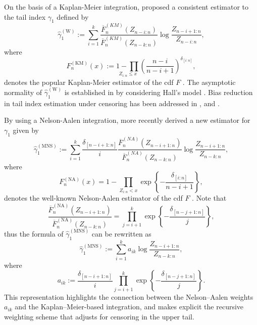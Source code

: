\documentclass[reqno,openbib,runningheads,a4paper,12pt]{amsart}%
\begin{document}
\noindent On the basis of a Kaplan-Meier integration, \cite{WW2014} proposed a
consistent estimator to the tail index $\gamma_{1}$ defined by
\[
\widehat{\gamma}_{1}^{\left(  \mathrm{W}\right)  }:=%
{\displaystyle\sum\limits_{i=1}^{k}}
\frac{\overline{F}_{n}^{\left(  KM\right)  }\left(  Z_{n-i:n}\right)
}{\overline{F}_{n}^{\left(  KM\right)  }\left(  Z_{n-k:n}\right)  }\log
\frac{Z_{n-i+1:n}}{Z_{n-i:n}},
\]
where
\[
F_{n}^{\left(  \mathrm{KM}\right)  }\left(  x\right)  :=\underset{Z_{i:n}\leq
x}{1-%
{\displaystyle\prod}
}\left(  \dfrac{n-i}{n-i+1}\right)  ^{\delta_{\left[  i:n\right]  }},
\]
denotes the popular Kaplan-Meier estimator of the cdf $F$ \citep[] []{KM58}.
The asymptotic normality of $\widehat{\gamma}_{1}^{\left(  \mathrm{W}\right)
}$ is established in \cite{BWW2019} by considering Hall's model
\citep[] []{Hall82}. Bias reduction in tail index estimation under censoring
has been addressed in \cite{BBWG2016}, \cite{BMV2018} and \cite{BWW2019}%
.\smallskip

\noindent By using a Nelson-Aalen integration, more recently \cite{MNS2025}
derived a new estimator for $\gamma_{1}$ given by%
\[
\widehat{\gamma}_{1}^{\left(  \mathrm{MNS}\right)  }:=%
{\displaystyle\sum\limits_{i=1}^{k}}
\frac{\delta_{\left[  n-i+1:n\right]  }}{i}\frac{\overline{F}_{n}^{\left(
NA\right)  }\left(  Z_{n-i+1:n}\right)  }{\overline{F}_{n}^{\left(  NA\right)
}\left(  Z_{n-k:n}\right)  }\log\frac{Z_{n-i+1:n}}{Z_{n-k:n}},
\]
where
\begin{equation}
F_{n}^{\left(  \mathrm{NA}\right)  }\left(  x\right)  =1-\prod_{Z_{i:n}<x}%
\exp\left\{  -\frac{\delta_{\left[  i:n\right]  }}{n-i+1}\right\}
,\label{Nelson}%
\end{equation}
denotes the well-known Nelson-Aalen estimator of the cdf $F$
\citep[] []{Nelson1972}. Note that
\begin{equation}
\frac{\overline{F}_{n}^{\left(  \mathrm{NA}\right)  }\left(  Z_{n-i+1:n}%
\right)  }{\overline{F}_{n}^{\left(  \mathrm{NA}\right)  }\left(
Z_{n-k:n}\right)  }=\prod_{j=i+1}^{k}\exp\left\{  -\frac{\delta_{\left[
n-j+1:n\right]  }}{j}\right\}  ,\label{ratio}%
\end{equation}
thus the formula of $\widehat{\gamma}_{1}^{\left(  \mathrm{MNS}\right)  }$ can
be rewritten as
\[
\widehat{\gamma}_{1}^{\left(  \mathrm{MNS}\right)  }:=%
{\displaystyle\sum\limits_{i=1}^{k}}
a_{ik}\log\frac{Z_{n-i+1:n}}{Z_{n-k:n}},
\]
where
\begin{equation}
a_{ik}:=\frac{\delta_{\left[  n-i+1:n\right]  }}{i}\prod_{j=i+1}^{k}%
\exp\left\{  -\frac{\delta_{\left[  n-j+1:n\right]  }}{j}\right\}
.\label{aik}%
\end{equation}
This representation highlights the connection between the Nelson--Aalen
weights $a_{ik}$ and the Kaplan--Meier-based integration, and makes explicit
the recursive weighting scheme that adjusts for censoring in the upper
tail.\smallskip
\end{document}
